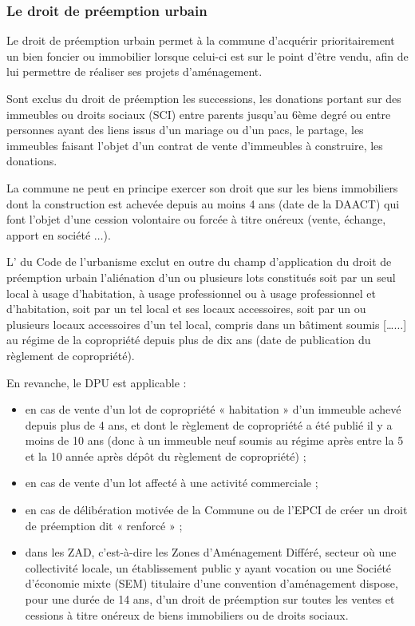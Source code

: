 		\subsubsection{Le droit de préemption urbain}
		
			Le droit de préemption urbain permet à la commune d'acquérir prioritairement un bien foncier ou
			immobilier lorsque celui-ci est sur le point d'être vendu, afin de lui permettre de réaliser ses projets
			d’aménagement.
			
			Sont exclus du droit de préemption les successions, les donations portant sur des immeubles ou droits
			sociaux (SCI) entre parents jusqu’au 6ème degré ou entre personnes ayant des liens issus d’un mariage ou
			d’un pacs, le partage, les immeubles faisant l'objet d'un contrat de vente d'immeubles à construire, les
			donations.
			
			La commune ne peut en principe exercer son droit que sur les biens immobiliers dont la construction est
			achevée depuis au moins 4 ans (date de la DAACT) qui font l'objet d'une cession volontaire ou forcée à titre
			onéreux (vente, échange, apport en société $\dots$).
			
			L' du Code de l'urbanisme exclut en outre du champ d'application du droit de préemption
			urbain l’aliénation d'un ou plusieurs lots constitués soit par un seul local à usage d'habitation, à usage
			professionnel ou à usage professionnel et d'habitation, soit par un tel local et ses locaux accessoires, soit
			par un ou plusieurs locaux accessoires d'un tel local, compris dans un bâtiment soumis […$\dots$] au régime de
			la copropriété depuis plus de dix ans (date de publication du règlement de copropriété).
			
			En revanche, le DPU est applicable :
			\begin{itemize}
				\item en cas de vente d’un lot de copropriété « habitation » d’un immeuble achevé depuis plus de
				4 ans, et dont le règlement de copropriété a été publié il y a moins de 10 ans (donc à un
				immeuble neuf soumis au régime après \VEFA{} entre la 5\ieme{} et la 10\ieme{} année après dépôt du
				règlement de copropriété) ;
				\item  en cas de vente d’un lot affecté à une activité commerciale ;
				\item  en cas de délibération motivée de la Commune ou de l’EPCI de créer un droit de préemption
				dit « renforcé » ;
				\item  dans les ZAD, c'est-à-dire les Zones d’Aménagement Différé, secteur où une collectivité locale,
				un établissement public y ayant vocation ou une Société d'économie mixte (SEM) titulaire
				d'une convention d'aménagement dispose, pour une durée de 14 ans, d'un droit de
				préemption sur toutes les ventes et cessions à titre onéreux de biens immobiliers ou de droits
				sociaux.
			\end{itemize}
			
